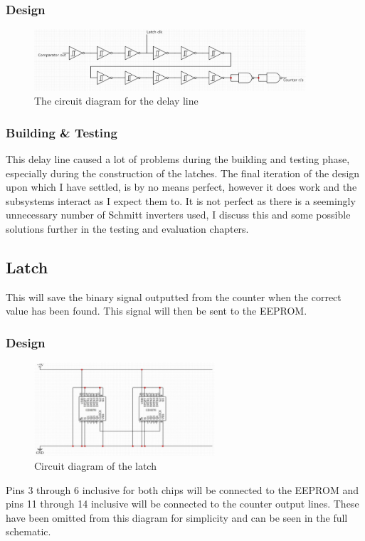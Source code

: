 \subsubsection{Design}
\begin{figure}[H]
    \centering
    \includegraphics[width=0.9\textwidth]{images/delayCircuitDiagram.jpg}
    \caption{The circuit diagram for the delay line}
    \label{fig:delayCircuitDiagram}
\end{figure}
\subsubsection{Building \& Testing}
This delay line caused a lot of problems during the building and testing phase, especially during the construction of the latches. The final iteration of the design upon which I have settled, is by no means perfect, however it does work and the subsystems interact as I expect them to. It is not perfect as there is a seemingly unnecessary number of Schmitt inverters used, I discuss this and some possible solutions further in the testing and evaluation chapters. 

\subsection{Latch}
This will save the binary signal outputted from the counter when the correct value has been found. This signal will then be sent to the EEPROM.
\subsubsection{Design}
\begin{figure} [H]
    \centering
    \includegraphics[width=0.6\textwidth]{images/latchCircuitDiagram.jpg}
    \caption{Circuit diagram of the latch}
    \label{fig:latchCircuitDiagram}
\end{figure}
\noindent Pins 3 through 6 inclusive for both chips will be connected to the EEPROM and pins 11 through 14 inclusive will be connected to the counter output lines. These have been omitted from this diagram for simplicity and can be seen in the full schematic.
